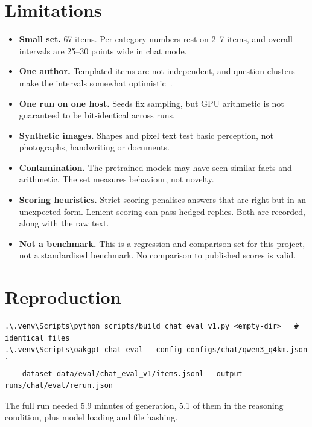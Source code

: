 \documentclass[11pt,a4paper]{article}
\begin{document}
\section{Limitations}
\begin{itemize}
\item \textbf{Small set.} 67 items. Per-category numbers rest on 2--7 items, and overall
  intervals are 25--30 points wide in chat mode.
\item \textbf{One author.} Templated items are not independent, and question clusters
  make the intervals somewhat optimistic~\cite{miller}.
\item \textbf{One run on one host.} Seeds fix sampling, but GPU arithmetic is not
  guaranteed to be bit-identical across runs.
\item \textbf{Synthetic images.} Shapes and pixel text test basic perception, not
  photographs, handwriting or documents.
\item \textbf{Contamination.} The pretrained models may have seen similar facts and
  arithmetic. The set measures behaviour, not novelty.
\item \textbf{Scoring heuristics.} Strict scoring penalises answers that are right but in
  an unexpected form. Lenient scoring can pass hedged replies. Both are recorded, along
  with the raw text.
\item \textbf{Not a benchmark.} This is a regression and comparison set for this project,
  not a standardised benchmark. No comparison to published scores is valid.
\end{itemize}

\section{Reproduction}
\begin{Verbatim}[fontsize=\footnotesize,frame=single,framesep=3mm]
.\.venv\Scripts\python scripts/build_chat_eval_v1.py <empty-dir>   # identical files
.\.venv\Scripts\oakgpt chat-eval --config configs/chat/qwen3_q4km.json `
  --dataset data/eval/chat_eval_v1/items.jsonl --output runs/chat/eval/rerun.json
\end{Verbatim}
The full run needed 5.9 minutes of generation, 5.1 of them in the reasoning condition,
plus model loading and file hashing.
\end{document}

